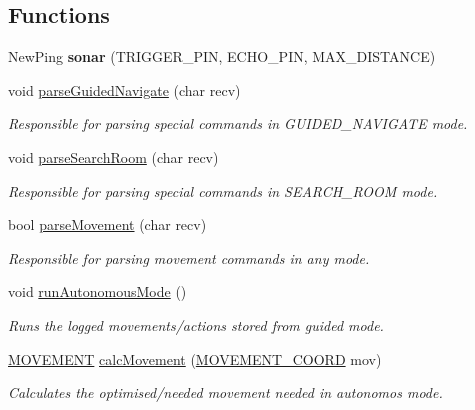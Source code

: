 \subsection*{Functions}
\begin{DoxyCompactItemize}
\item 
\hypertarget{robotcode_8ino_a9a97a20c8deb22c7db7d5cbd5d10a98f}{New\+Ping {\bfseries sonar} (T\+R\+I\+G\+G\+E\+R\+\_\+\+P\+I\+N, E\+C\+H\+O\+\_\+\+P\+I\+N, M\+A\+X\+\_\+\+D\+I\+S\+T\+A\+N\+C\+E)}\label{robotcode_8ino_a9a97a20c8deb22c7db7d5cbd5d10a98f}

\item 
void \hyperlink{robotcode_8ino_abbe89b02b936909feba8810c9675390f}{parse\+Guided\+Navigate} (char recv)
\begin{DoxyCompactList}\small\item\em Responsible for parsing special commands in G\+U\+I\+D\+E\+D\+\_\+\+N\+A\+V\+I\+G\+A\+T\+E mode. \end{DoxyCompactList}\item 
void \hyperlink{robotcode_8ino_aaaf5bee7c4545b94a6adda4907544241}{parse\+Search\+Room} (char recv)
\begin{DoxyCompactList}\small\item\em Responsible for parsing special commands in S\+E\+A\+R\+C\+H\+\_\+\+R\+O\+O\+M mode. \end{DoxyCompactList}\item 
bool \hyperlink{robotcode_8ino_adb00c91c925985a922f8c668dd439000}{parse\+Movement} (char recv)
\begin{DoxyCompactList}\small\item\em Responsible for parsing movement commands in any mode. \end{DoxyCompactList}\item 
void \hyperlink{robotcode_8ino_a28ad219170e626db83c63dfb8629d38c}{run\+Autonomous\+Mode} ()
\begin{DoxyCompactList}\small\item\em Runs the logged movements/actions stored from guided mode. \end{DoxyCompactList}\item 
\hyperlink{robotcode_8ino_adc716dd21485bffb9015eaeb3cfe6859}{M\+O\+V\+E\+M\+E\+N\+T} \hyperlink{robotcode_8ino_afe70bedfede401b2e61d7e2a54120bea}{calc\+Movement} (\hyperlink{structMOVEMENT__COORD}{M\+O\+V\+E\+M\+E\+N\+T\+\_\+\+C\+O\+O\+R\+D} mov)
\begin{DoxyCompactList}\small\item\em Calculates the optimised/needed movement needed in autonomos mode. \end{DoxyCompactList}\item 

\end{DoxyCompactItemize}
